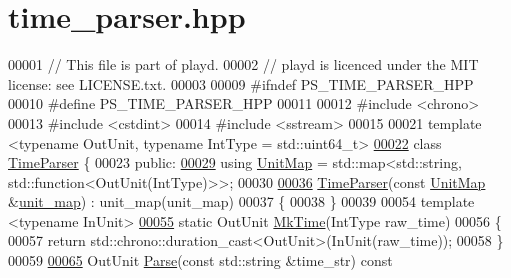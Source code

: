 \hypertarget{time__parser_8hpp_source}{\section{time\+\_\+parser.\+hpp}
\label{time__parser_8hpp_source}
}

\begin{DoxyCode}
00001 \textcolor{comment}{// This file is part of playd.}
00002 \textcolor{comment}{// playd is licenced under the MIT license: see LICENSE.txt.}
00003 
00009 \textcolor{preprocessor}{#ifndef PS\_TIME\_PARSER\_HPP}
00010 \textcolor{preprocessor}{#define PS\_TIME\_PARSER\_HPP}
00011 
00012 \textcolor{preprocessor}{#include <chrono>}
00013 \textcolor{preprocessor}{#include <cstdint>}
00014 \textcolor{preprocessor}{#include <sstream>}
00015 
00021 \textcolor{keyword}{template} <\textcolor{keyword}{typename} OutUnit, \textcolor{keyword}{typename} IntType = std::u\textcolor{keywordtype}{int}64\_t>
\hypertarget{time__parser_8hpp_source_l00022}{}\hyperlink{classTimeParser}{00022} \textcolor{keyword}{class }\hyperlink{classTimeParser}{TimeParser} \{
00023 \textcolor{keyword}{public}:
\hypertarget{time__parser_8hpp_source_l00029}{}\hyperlink{classTimeParser_adc32afc638ace5060a2134f8f74d3c60}{00029}     \textcolor{keyword}{using} \hyperlink{classTimeParser_adc32afc638ace5060a2134f8f74d3c60}{UnitMap} = std::map<std::string, std::function<OutUnit(IntType)>>;
00030 
\hypertarget{time__parser_8hpp_source_l00036}{}\hyperlink{classTimeParser_a66c6443db8e5d38b8f3d7e7a4eea783a}{00036}     \hyperlink{classTimeParser_a66c6443db8e5d38b8f3d7e7a4eea783a}{TimeParser}(\textcolor{keyword}{const} \hyperlink{classTimeParser_adc32afc638ace5060a2134f8f74d3c60}{UnitMap} &\hyperlink{classTimeParser_a98bb2b31f6ad5210139bc87ef7ad0121}{unit\_map}) : unit\_map(unit\_map)
00037     \{
00038     \}
00039 
00054     \textcolor{keyword}{template} <\textcolor{keyword}{typename} InUnit>
\hypertarget{time__parser_8hpp_source_l00055}{}\hyperlink{classTimeParser_af0e270392bd5313b1d60e66e35dbfe82}{00055}     \textcolor{keyword}{static} OutUnit \hyperlink{classTimeParser_af0e270392bd5313b1d60e66e35dbfe82}{MkTime}(IntType raw\_time)
00056     \{
00057         \textcolor{keywordflow}{return} std::chrono::duration\_cast<OutUnit>(InUnit(raw\_time));
00058     \}
00059 
\hypertarget{time__parser_8hpp_source_l00065}{}\hyperlink{classTimeParser_a68110dc8c7d2ad1a8f47a29646ad4d1c}{00065}     OutUnit \hyperlink{classTimeParser_a68110dc8c7d2ad1a8f47a29646ad4d1c}{Parse}(\textcolor{keyword}{const} std::string &time\_str)\textcolor{keyword}{ const}

\end{DoxyCode}
